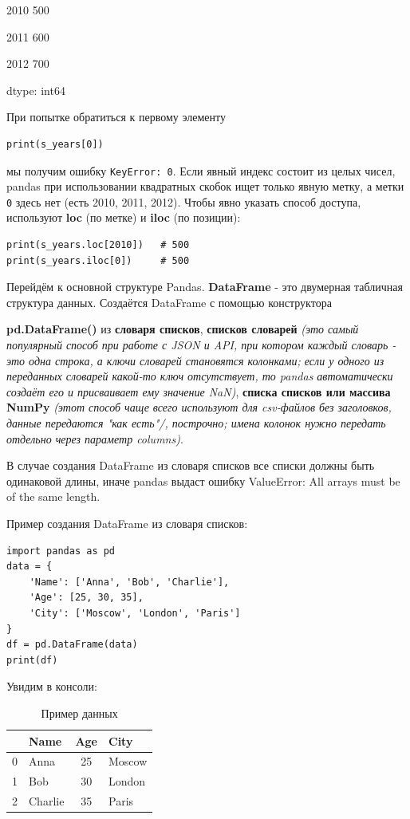 \documentclass[pract]{SCWorks}
\begin{document}
2010    500

2011    600

2012    700

dtype: int64

При попытке обратиться к первому элементу
\begin{verbatim}
print(s_years[0])
\end{verbatim}
мы получим ошибку \texttt{KeyError: 0}. Если явный индекс состоит из целых чисел, pandas при использовании
квадратных скобок ищет только явную метку, а метки \texttt{0} здесь нет (есть 2010, 2011, 2012). Чтобы
явно указать способ доступа, используют \textbf{loc} (по метке) и \textbf{iloc} (по позиции):

\begin{verbatim}
print(s_years.loc[2010])   # 500
print(s_years.iloc[0])     # 500
\end{verbatim} 

Перейдём к основной структуре Pandas. \textbf{DataFrame} - это двумерная табличная структура данных.
Создаётся DataFrame с помощью конструктора 

\textbf{pd.DataFrame()} из \textbf{словаря списков}, \textbf{списков словарей} 
\textit{(это самый популярный способ при работе с JSON и API, при котором каждый словарь - это одна строка, а ключи 
словарей становятся колонками; если у одного из переданных словарей какой-то ключ отсутствует, то pandas автоматически 
создаёт его и присваивает ему значение NaN)}, \textbf{списка списков или массива NumPy} \textit{(этот способ чаще всего 
используют для csv-файлов без заголовков, данные передаются "как есть"/, построчно; имена колонок нужно 
передать отдельно через параметр columns)}.

В случае создания DataFrame из словаря списков все списки должны быть одинаковой длины, иначе pandas выдаст 
ошибку ValueError: All arrays must be of the same length.

Пример создания DataFrame из словаря списков:

\begin{verbatim}
import pandas as pd
data = {
    'Name': ['Anna', 'Bob', 'Charlie'],
    'Age': [25, 30, 35],
    'City': ['Moscow', 'London', 'Paris']
}
df = pd.DataFrame(data)
print(df)
\end{verbatim}
Увидим в консоли:

\begin{table}[H]
\centering
\caption{Пример данных}
\begin{tabular}{c l c l }
\hline
 & \textbf{Name} & \textbf{Age} & \textbf{City} \\ \hline
0 & Anna   & 25 & Moscow  \\ \hline
1 & Bob    & 30 & London  \\ \hline
2 & Charlie & 35 & Paris   \\ \hline
\end{tabular}
\end{table}
\end{document}
